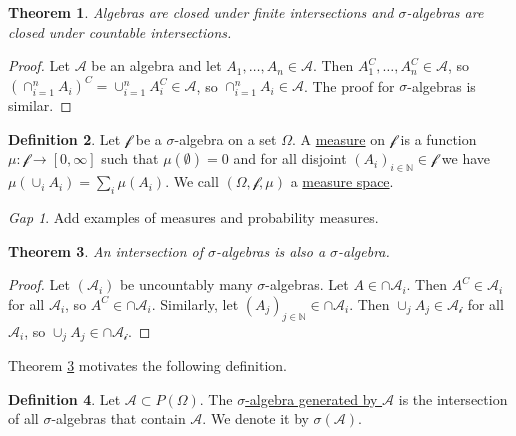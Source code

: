 \documentclass[11pt]{article}
\newcommand{\col}[1]{\mathscr{#1}}
\newcommand{\defname}[1]{\underline{#1}}
\newcommand{\NN}{\mathbb{N}}
\theoremstyle{theorem}
\newtheorem{theorem}{Theorem}[section]
\theoremstyle{definition}
\newtheorem{definition}[theorem]{Definition}
\theoremstyle{remark}
\theoremstyle{step}
\theoremstyle{gap}
\newtheorem*{gap}{Gap}
\begin{document}
\begin{theorem}
Algebras are closed under finite intersections and \(\sigma\)-algebras are closed under countable intersections.
\end{theorem}

\begin{proof}
Let \(\col{A}\) be an algebra and let \(A_1, \ldots, A_n \in \col{A}\). Then \(A_1^C, \ldots, A_n^C \in \col{A}\), so \(\left(\cap_{i=1}^n A_i\right)^C = \cup_{i=1}^n A_i^C \in \col{A}\), so \(\cap_{i=1}^n A_i \in \col{A}\). The proof for \(\sigma\)-algebras is similar.
\end{proof}

\begin{definition}
Let \(\col{f}\) be a \(\sigma\)-algebra on a set \(\Omega\). A \defname{measure} on \(\col{f}\) is a function \(\mu:\col{f} \to [0, \infty]\) such that \(\mu(\emptyset) = 0\) and for all disjoint \(\left(A_i\right)_{i\in \NN} \in \col{f}\) we have \(\mu\left(\cup_i A_i\right) = \sum_i \mu\left(A_i\right)\). We call \((\Omega, \col{f}, \mu)\) a \defname{measure space}.
\end{definition}

\begin{gap}
Add examples of measures and probability measures.
\end{gap}

\begin{theorem}\label{thm.intersection-algebras}
An intersection of \(\sigma\)-algebras is also a \(\sigma\)-algebra.
\end{theorem}

\begin{proof}
Let \((\col{A}_i)\) be uncountably many \(\sigma\)-algebras. Let \(A \in \cap \col{A}_i\). Then \(A^C \in \col{A}_i\) for all \(\col{A}_i\), so \(A^C \in \cap \col{A}_i\). Similarly, let \((A_j)_{j \in \NN} \in \cap \col{A}_i\). Then \(\cup_j A_j \in \col{A_i}\) for all \(\col{A}_i\), so \(\cup_j A_j \in \cap \col{A_i}\).
\end{proof}

Theorem \ref{thm.intersection-algebras} motivates the following definition.

\begin{definition}
Let \(\col{A} \subset P\left(\Omega\right)\). The \defname{\(\sigma\)-algebra generated by \(\col{A}\)} is the intersection of all \(\sigma\)-algebras that contain \(\col{A}\). We denote it by \(\sigma(\col{A})\).
\end{definition}
\end{document}
